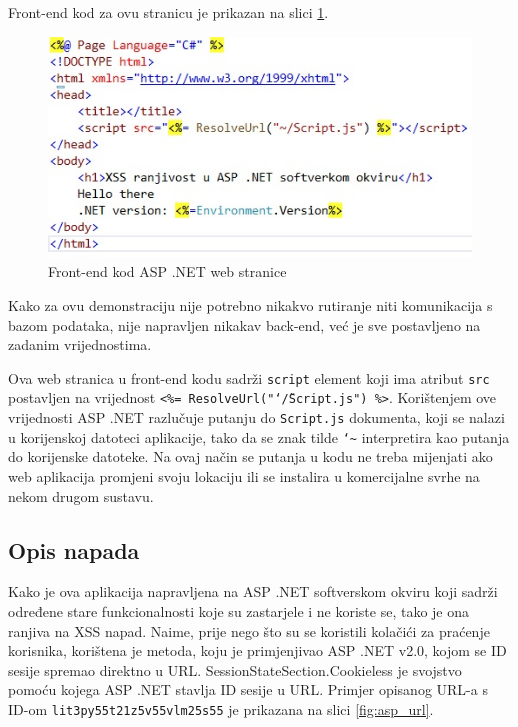 \documentclass[12pt, oneside, onecolumn]{book}
\begin{document}
{\pagebreak

Front-end kod za ovu stranicu je prikazan na slici \ref{fig:asp_f}. 

\begin{figure}[H]
	\begin{center}
		\includegraphics[width=\textwidth]{asp_f.jpg}
		\caption{Front-end kod ASP .NET web stranice} \label{fig:asp_f}
	\end{center}
\end{figure}

Kako za ovu demonstraciju nije potrebno nikakvo rutiranje niti komunikacija s bazom podataka, nije napravljen nikakav back-end, već je sve postavljeno na zadanim vrijednostima.

Ova web stranica u front-end kodu sadrži \texttt{script} element koji ima atribut \texttt{src} postavljen na vrijednost \texttt{<\%= ResolveUrl("\char`\~/Script.js") \%>}. Korištenjem ove vrijednosti ASP .NET razlučuje putanju do \texttt{Script.js} dokumenta, koji se nalazi u korijenskoj datoteci aplikacije, tako da se znak tilde \texttt{\char`\~} interpretira kao putanja do korijenske datoteke. Na ovaj način se putanja u kodu ne treba mijenjati ako web aplikacija promjeni svoju lokaciju ili se instalira u komercijalne svrhe na nekom drugom sustavu.

\subsection{Opis napada}
Kako je ova aplikacija napravljena na ASP .NET softverskom okviru koji sadrži određene stare funkcionalnosti koje su zastarjele i ne koriste se, tako je ona ranjiva na XSS napad. Naime, prije nego što su se koristili kolačići za praćenje korisnika, korištena je metoda, koju je primjenjivao ASP .NET v2.0, kojom se ID sesije spremao direktno u URL. SessionStateSection.Cookieless je svojstvo pomoću kojega ASP .NET stavlja ID sesije u URL. Primjer opisanog URL-a s ID-om \texttt{lit3py55t21z5v55vlm25s55} je prikazana na slici \ref{fig:asp_url}.

}
\end{document}

